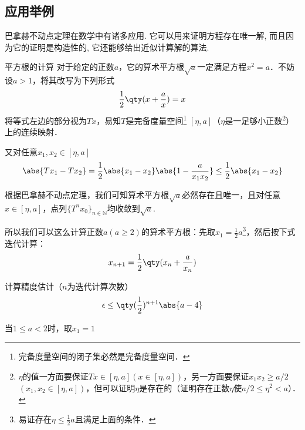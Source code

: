 \subsection{应用举例}
巴拿赫不动点定理在数学中有诸多应用. 它可以用来证明方程存在唯一解, 而且因为它的证明是构造性的, 它还能够给出近似计算解的算法.

\begin{example}{平方根的计算}
对于给定的正数$a$，它的算术平方根$\sqrt{a}$一定满足方程$x^2=a$．不妨设$a>1$，将其改写为下列形式
\begin{equation}
\frac{1}{2}\qty(x+\frac{a}{x})=x
\end{equation}
将等式左边的部分视为$Tx$，易知$T$是完备度量空间\footnote{完备度量空间的闭子集必然是完备度量空间．} $[\eta,a]$（$\eta$是一足够小正数\footnote{$\eta$的值一方面要保证$Tx\in[\eta,a](x\in[\eta,a])$，另一方面要保证$x_1x_2 \geq a/2$ $(x_1,x_2\in[\eta,a])$，但可以证明$\eta$是存在的（证明存在正数$\eta$使$a/2\leq \eta^2<a$）．}）上的连续映射．

又对任意$x_1,x_2\in [\eta,a]$
\begin{equation}
\abs{Tx_1 -  Tx_2}=\frac{1}{2}\abs{x_1 - x_2}\abs{1-\frac{a}{x_1x_2}}\leq\frac{1}{2}\abs{x_1 - x_2}
\end{equation}

根据巴拿赫不动点定理，我们可知算术平方根$\sqrt{a}$必然存在且唯一，且对任意$x\in[\eta,a]$，点列$\{T^nx_0\}_{n\in\mathbb{N}}$均收敛到$\sqrt{a}$.

所以我们可以这么计算正数$a(a\geq 2)$的算术平方根：先取$x_1=\frac{1}{2}a$\footnote{易证存在$\eta\leq\frac{1}{2}a$且满足上面的条件．}，然后按下式迭代计算：
\begin{equation}
x_{n+1}=\frac{1}{2}\qty(x_n+\frac{a}{x_n})
\end{equation}

计算精度估计（$n$为迭代计算次数）
\begin{equation}
\epsilon\leq\qty(\frac{1}{2})^{n+1}\abs{a-4}
\end{equation}

当$1\leq a<2$时，取$x_1=1$
\end{example}
